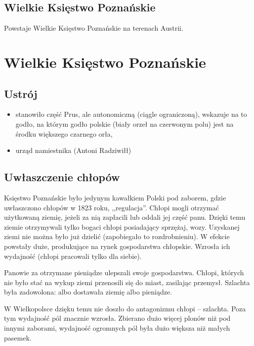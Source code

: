 \documentclass [a4paper, 11pt, oneside]{book}
\begin{document}
        \subsection{Wielkie Księstwo Poznańskie} %
        \label{sub:wielkie_ksi_stwo_pozna_skie}
            Powstaje Wielkie Księstwo Poznańskie na terenach Austrii.

    \section{Wielkie Księstwo Poznańskie} %
    \label{sec:wielkie_ksi_stwo_pozna_skie}
        \subsection{Ustrój} %
        \label{sub:ustr_j}
            \begin{itemize}
                \item stanowiło część Prus, ale autonomiczną (ciągle ograniczoną), wskazuje na to godło, na którym godło polskie (biały orzeł na czerwonym polu) jest na środku większego czarnego orła,
                \item urząd namiestnika (Antoni Radziwiłł)
            \end{itemize}
        \subsection{Uwłaszczenie chłopów} %
        \label{sub:uw_aszczenie_ch_op_w}
            Księstwo Poznańskie było jedynym kawałkiem Polski pod zaborem, gdzie uwłaszczono chłopów w 1823 roku, ,,regulacja''. Chłopi mogli otrzymać użytkowaną ziemię, jeżeli za nią zapłacili lub oddali jej część panu. Dzięki temu ziemie otrzymywali tylko bogaci chłopi posiadający sprzężaj, wozy. Uzyskanej ziemi nie można było już dzielić (zapobiegało to rozdrobnieniu). W efekcie powstały duże, produkujące na rynek gospodarstwa chłopskie. Wzrosła ich wydajność (chłopi pracowali tylko dla siebie).

            Panowie za otrzymane pieniądze ulepszali swoje gospodarstwa. Chłopi, których nie było stać na wykup ziemi przenosili się do miast, zasilając przemysł. Szlachta była zadowolona: albo dostawała ziemię albo pieniądze.

            W Wielkopolsce dzięku temu nie doszło do antagonizmu chłopi -- szlachta. Poza tym wydajność pól znacznie wzrosła. Zbierano dużo więcej plonów niż pod innymi zaborami, wydajność ogromnych pól była dużo większa niż małych pasemek.
\end{document}
